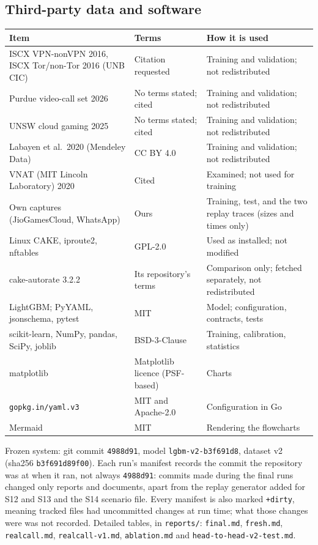 \documentclass[11pt,a4paper]{article}
\begin{document}
\subsection*{Third-party data and software}
\begin{table}[H]\centering\footnotesize
\begin{tabularx}{\linewidth}{@{}l>{\raggedright\arraybackslash}X>{\raggedright\arraybackslash}X@{}}
\toprule
Item & Terms & How it is used \\
\midrule
ISCX VPN-nonVPN 2016, ISCX Tor/non-Tor 2016 (UNB CIC) & Citation requested & Training and validation; not redistributed \\
Purdue video-call set 2026 & No terms stated; cited & Training and validation; not redistributed \\
UNSW cloud gaming 2025 & No terms stated; cited & Training and validation; not redistributed \\
Labayen et al.\ 2020 (Mendeley Data) & CC BY 4.0 & Training and validation; not redistributed \\
VNAT (MIT Lincoln Laboratory) 2020 & Cited & Examined; not used for training \\
Own captures (JioGamesCloud, WhatsApp) & Ours & Training, test, and the two replay traces (sizes and times only) \\
Linux CAKE, iproute2, nftables & GPL-2.0 & Used as installed; not modified \\
cake-autorate 3.2.2 & Its repository's terms & Comparison only; fetched separately, not redistributed \\
LightGBM; PyYAML, jsonschema, pytest & MIT & Model; configuration, contracts, tests \\
scikit-learn, NumPy, pandas, SciPy, joblib & BSD-3-Clause & Training, calibration, statistics \\
matplotlib & Matplotlib licence (PSF-based) & Charts \\
\texttt{gopkg.in/yaml.v3} & MIT and Apache-2.0 & Configuration in Go \\
Mermaid & MIT & Rendering the flowcharts \\
\bottomrule
\end{tabularx}
\end{table}

Frozen system: git commit \texttt{4988d91}, model \texttt{lgbm-v2-b3f691d8}, dataset v2 (sha256 \texttt{b3f691d89f00}). Each run's manifest records the commit the repository was at when it ran, not always \texttt{4988d91}: commits made during the final runs changed only reports and documents, apart from the replay generator added for S12 and S13 and the S14 scenario file. Every manifest is also marked \texttt{+dirty}, meaning tracked files had uncommitted changes at run time; what those changes were was not recorded. Detailed tables, in \texttt{reports/}: \texttt{final.md}, \texttt{fresh.md}, \texttt{realcall.md}, \texttt{realcall-v1.md}, \texttt{ablation.md} and \texttt{head-to-head-v2-test.md}.
\end{document}
